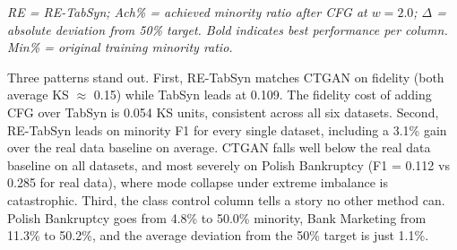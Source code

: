 \begin{table}[H]
\centering
\caption{Comprehensive results across all datasets and metrics}
\label{tab:comprehensive_results}
\footnotesize


\vspace{4pt}
\par{\scriptsize\textit{RE = RE-TabSyn; Ach\% = achieved minority ratio after CFG at $w=2.0$; $\Delta$ = absolute deviation from 50\% target. Bold indicates best performance per column. Min\% = original training minority ratio.}}
\end{table}

Three patterns stand out. First, RE-TabSyn matches CTGAN on fidelity (both average KS $\approx$ 0.15) while TabSyn leads at 0.109. The fidelity cost of adding CFG over TabSyn is 0.054 KS units, consistent across all six datasets. Second, RE-TabSyn leads on minority F1 for every single dataset, including a 3.1\% gain over the real data baseline on average. CTGAN falls well below the real data baseline on all datasets, and most severely on Polish Bankruptcy (F1 = 0.112 vs 0.285 for real data), where mode collapse under extreme imbalance is catastrophic. Third, the class control column tells a story no other method can. Polish Bankruptcy goes from 4.8\% to 50.0\% minority, Bank Marketing from 11.3\% to 50.2\%, and the average deviation from the 50\% target is just 1.1\%.

